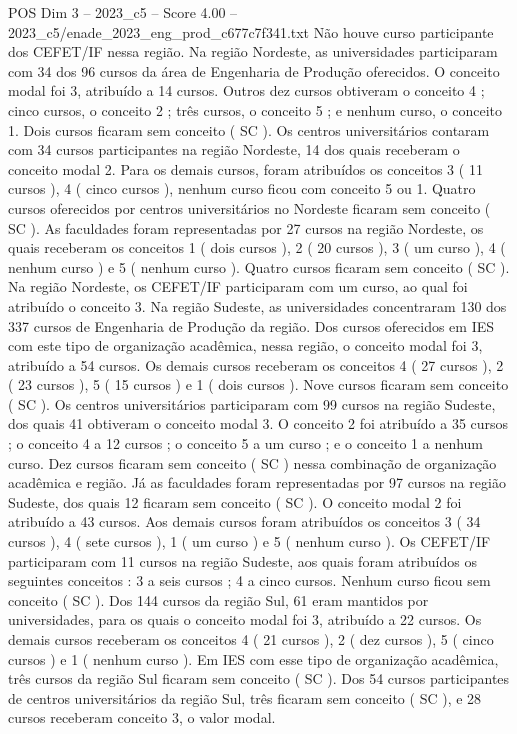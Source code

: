 \begin{textsample}{POS Dim 3 – 2023\_c5 – Score 4.00 – 2023\_c5/enade\_2023\_eng\_prod\_c677c7f341.txt}
Não houve curso participante dos CEFET/IF nessa região.
Na região Nordeste, as universidades participaram com 34 dos 96 cursos da área de Engenharia de Produção oferecidos.
O conceito modal foi 3, atribuído a 14 cursos.
Outros dez cursos obtiveram o conceito 4 ; cinco cursos, o conceito 2 ; três cursos, o conceito 5 ; e nenhum curso, o conceito 1.
Dois cursos ficaram sem conceito ( SC ).
Os centros universitários contaram com 34 cursos participantes na região Nordeste, 14 dos quais receberam o conceito modal 2.
Para os demais cursos, foram atribuídos os conceitos 3 ( 11 cursos ), 4 ( cinco cursos ), nenhum curso ficou com conceito 5 ou 1.
Quatro cursos oferecidos por centros universitários no Nordeste ficaram sem conceito ( SC ).
As faculdades foram representadas por 27 cursos na região Nordeste, os quais receberam os conceitos 1 ( dois cursos ), 2 ( 20 cursos ), 3 ( um curso ), 4 ( nenhum curso ) e 5 ( nenhum curso ).
Quatro cursos ficaram sem conceito ( SC ).
Na região Nordeste, os CEFET/IF participaram com um curso, ao qual foi atribuído o conceito 3.
Na região Sudeste, as universidades concentraram 130 dos 337 cursos de Engenharia de Produção da região.
Dos cursos oferecidos em IES com este tipo de organização acadêmica, nessa região, o conceito modal foi 3, atribuído a 54 cursos.
Os demais cursos receberam os conceitos 4 ( 27 cursos ), 2 ( 23 cursos ), 5 ( 15 cursos ) e 1 ( dois cursos ).
Nove cursos ficaram sem conceito ( SC ).
Os centros universitários participaram com 99 cursos na região Sudeste, dos quais 41 obtiveram o conceito modal 3.
O conceito 2 foi atribuído a 35 cursos ; o conceito 4 a 12 cursos ; o conceito 5 a um curso ; e o conceito 1 a nenhum curso.
Dez cursos ficaram sem conceito ( SC ) nessa combinação de organização acadêmica e região.
Já as faculdades foram representadas por 97 cursos na região Sudeste, dos quais 12 ficaram sem conceito ( SC ).
O conceito modal 2 foi atribuído a 43 cursos.
Aos demais cursos foram atribuídos os conceitos 3 ( 34 cursos ), 4 ( sete cursos ), 1 ( um curso ) e 5 ( nenhum curso ).
Os CEFET/IF participaram com 11 cursos na região Sudeste, aos quais foram atribuídos os seguintes conceitos : 3 a seis cursos ; 4 a cinco cursos.
Nenhum curso ficou sem conceito ( SC ).
Dos 144 cursos da região Sul, 61 eram mantidos por universidades, para os quais o conceito modal foi 3, atribuído a 22 cursos.
Os demais cursos receberam os conceitos 4 ( 21 cursos ), 2 ( dez cursos ), 5 ( cinco cursos ) e 1 ( nenhum curso ).
Em IES com esse tipo de organização acadêmica, três cursos da região Sul ficaram sem conceito ( SC ).
Dos 54 cursos participantes de centros universitários da região Sul, três ficaram sem conceito ( SC ), e 28 cursos receberam conceito 3, o valor modal.

\end{textsample}
